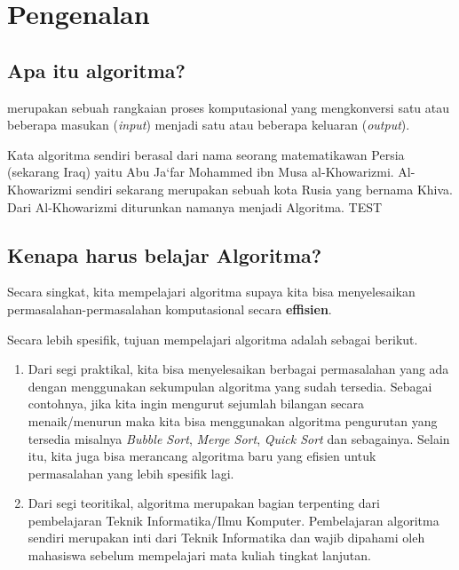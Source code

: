 \chapter{Pengenalan}\label{ch:pengantarAlgoritma}


\section{Apa itu algoritma?}
 merupakan sebuah rangkaian proses komputasional yang mengkonversi satu atau beberapa masukan (\textit{input}) menjadi satu atau beberapa keluaran (\textit{output}). 

Kata algoritma sendiri berasal dari nama seorang matematikawan Persia (sekarang Iraq) yaitu Abu Ja`far Mohammed ibn Musa al-Khowarizmi. Al-Khowarizmi sendiri sekarang merupakan sebuah kota Rusia yang bernama Khiva. Dari Al-Khowarizmi diturunkan namanya menjadi Algoritma. TEST

\section{Kenapa harus belajar Algoritma?}
Secara singkat, kita mempelajari algoritma supaya kita bisa menyelesaikan permasalahan-permasalahan komputasional secara \textbf{effisien}.  

Secara lebih spesifik, tujuan mempelajari algoritma adalah sebagai berikut.
\begin{enumerate}
	\item Dari segi praktikal, kita bisa menyelesaikan berbagai permasalahan yang ada dengan menggunakan sekumpulan algoritma yang sudah tersedia. Sebagai contohnya, jika kita ingin mengurut sejumlah bilangan secara menaik/menurun maka kita bisa menggunakan algoritma pengurutan yang tersedia misalnya \textit{Bubble Sort}, \textit{Merge Sort}, \textit{Quick Sort} dan sebagainya. Selain itu, kita juga bisa merancang algoritma baru yang efisien untuk permasalahan yang lebih spesifik lagi.
	\item Dari segi teoritikal, algoritma merupakan bagian terpenting dari pembelajaran Teknik Informatika/Ilmu Komputer. Pembelajaran algoritma sendiri merupakan inti dari Teknik Informatika dan wajib dipahami oleh mahasiswa sebelum mempelajari mata kuliah tingkat lanjutan.
\end{enumerate}

